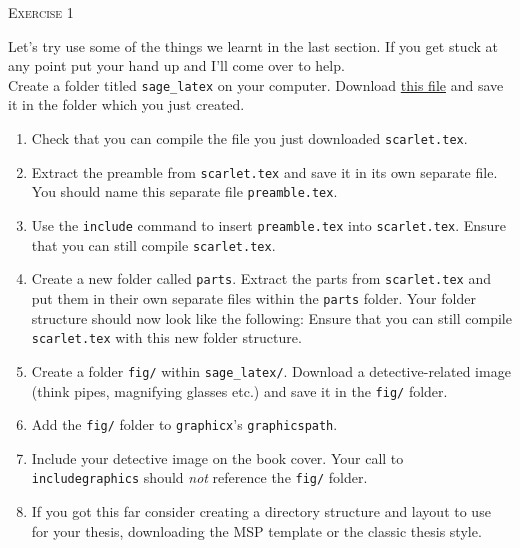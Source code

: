 \documentclass{article}
\begin{document}
\begin{center}
  \Large\textsc{Exercise 1}
\end{center}

Let's try use some of the things we learnt in the last section. If you
get stuck at any point put your hand up and I'll come over to help.\\

Create a folder titled \texttt{sage\_latex} on your computer. Download
\href{https://jwalton.info/assets/teaching/latex/scarlet.tex}{this file} 
and save it in the folder which you just created.

\begin{enumerate}
  \item Check that you can compile the file you just downloaded
    \texttt{scarlet.tex}.

  \item Extract the preamble from \texttt{scarlet.tex} and save it in its own
    separate file. You should name this separate file
    \texttt{preamble.tex}.

  \item Use the \texttt{\tb include} command to insert
    \texttt{preamble.tex} into \texttt{scarlet.tex}. Ensure that you can
    still compile \texttt{scarlet.tex}.

  \item{Create a new folder called \texttt{parts}. Extract the parts from 
    \texttt{scarlet.tex} and put them in their own separate files within
    the \texttt{parts} folder. Your folder structure should now look
    like the following:
    \vspace{0.25cm}
    Ensure that you can still compile \texttt{scarlet.tex} with this new 
    folder structure.}

  \item Create a folder \texttt{fig/} within \texttt{sage\_latex/}. Download a
    detective-related image (think pipes, magnifying glasses etc.) and
    save it in the \texttt{fig/} folder.

  \item Add the \texttt{fig/} folder to \texttt{graphicx}'s
    \texttt{graphicspath}.

  \item Include your detective image on the book cover. Your call to
	  \texttt{\tb includegraphics} should \emph{not} reference the
    \texttt{fig/} folder.
    
  \item If you got this far consider creating a directory structure and layout
    to use for your thesis, downloading the MSP template or the classic
    thesis style.
\end{enumerate}
\end{document}
